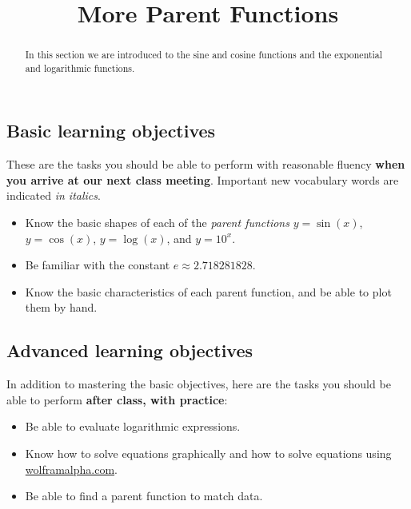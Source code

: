 \documentclass{ximera}
\title{More Parent Functions}
\begin{document}
\begin{abstract}
In this section we are introduced to the sine and cosine functions and the exponential and logarithmic functions.
\end{abstract}
\maketitle

\subsection*{Basic learning objectives}

These are the tasks you should be able to perform with reasonable fluency \textbf{when you arrive at our next class meeting}. Important new vocabulary words are indicated \emph{in italics}. 

\begin{itemize}
	\item Know the basic shapes of each of the \emph{parent functions} $y=\sin(x)$, $y=\cos(x)$, $y=\log(x)$, and  $y=10^x$.
	\item Be familiar with the constant $e\approx 2.718281828$.
	\item Know the basic characteristics of each parent function, and be able to plot them by hand.
\end{itemize}

\subsection*{Advanced learning objectives}

In addition to mastering the basic objectives, here are the tasks you should be able to perform \textbf{after class, with practice}: 

\begin{itemize}
	\item Be able to evaluate logarithmic expressions.
	\item Know how to solve equations graphically and how to solve equations using \url{wolframalpha.com}.
	\item Be able to find a parent function to match data.
\end{itemize}
\end{document}
